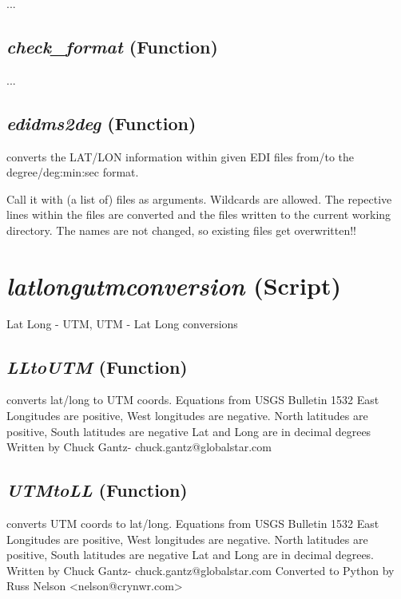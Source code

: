 ...

\subsection{\textit{check\_format} (Function)}
\label{ssec:utils.edidms2deg.check_format}

...

\subsection{\textit{edidms2deg} (Function)}
\label{ssec:utils.edidms2deg.edidms2deg}


converts the LAT/LON information within given EDI files from/to the degree/deg:min:sec format.

    Call it with (a list of) files as arguments. Wildcards are
    allowed. The repective lines within the files are converted and
    the files written to the current working directory. The names are
    not changed, so existing files get overwritten!!






\section{\textit{latlongutmconversion} (Script)}
\label{sec:utils.latlongutmconversion}

 Lat Long - UTM, UTM - Lat Long conversions


\subsection{\textit{LLtoUTM} (Function)}
\label{ssec:utils.latlongutmconversion.LLtoUTM}

converts lat/long to UTM coords.  Equations from USGS Bulletin 1532 
    East Longitudes are positive, West longitudes are negative. 
    North latitudes are positive, South latitudes are negative
    Lat and Long are in decimal degrees
    Written by Chuck Gantz- chuck.gantz@globalstar.com  

\subsection{\textit{UTMtoLL} (Function)}
\label{ssec:utils.latlongutmconversion.UTMtoLL}

converts UTM coords to lat/long.  Equations from USGS Bulletin 1532 
    East Longitudes are positive, West longitudes are negative. 
    North latitudes are positive, South latitudes are negative
    Lat and Long are in decimal degrees. 
    Written by Chuck Gantz- chuck.gantz@globalstar.com
    Converted to Python by Russ Nelson <nelson@crynwr.com>


